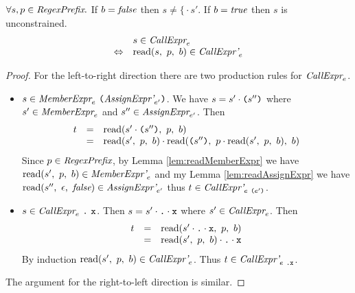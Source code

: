 \documentclass[preprint,10pt]{sigplanconf}
\begin{document}
\begin{lemma}\mbox{}
  
  \( \forall s, p \in \textit{RegexPrefix}. \)
  If \( b = \textit{false} \) then \( s \not = \texttt{\{} \cdot s' \). If \(
  b = \textit{true} \) then \( s \) is unconstrained.
  \[ 
  \begin{array}{rl}
  &s \in \textit{CallExpr}_{e} 
  \\
  \Leftrightarrow &
  \textrm{read}(s,~p,~b) \in \textit{CallExpr'}_{e} 
  \end{array}
  \]
\end{lemma}
\begin{proof}
  For the left-to-right direction there are two production rules for
  \( \textit{CallExpr}_{e} \).
  \begin{itemize}
  \item \( s \in
    \textit{MemberExpr}_{e}~ \texttt{(}\textit{AssignExpr'}_{e'}\texttt{)} \). We
    have \( s = s' \cdot \texttt{(}s''\texttt{)} \) where \( s' \in
    \textit{MemberExpr}_{e} \) and \( s'' \in \textit{AssignExpr}_{e'} \).
    Then
    \[
    \begin{array}{rcl}
      t &=& \textrm{read}(s' \cdot \texttt{(}s''\texttt{)},~p,~b)
      \\
      &=& \textrm{read}(s',~p,~b) \cdot
      \textrm{read}(\texttt{(}s''\texttt{)},~
        p \cdot \textrm{read}(s',~p,~b)
      ,~b)
    \end{array}
    \]
    Since \( p \in \textit{RegexPrefix} \), by Lemma
    \ref{lem:readMemberExpr} we have \( \textrm{read}(s',~p,~b) \in
    \textit{MemberExpr'}_{e} \) and my Lemma
    \ref{lem:readAssignExpr} we have
    \(\textrm{read}(s'',~\epsilon,~\textit{false}) \in
    \textit{AssignExpr'}_{e'} \) thus \( t \in
    \textit{CallExpr'}_{e~\texttt{(}e'\texttt{)}} \).

  \item \( s \in \textit{CallExpr}_{e} ~\texttt{.} ~\texttt{x} \). Then \( s =
    s' \cdot \texttt{.}\cdot \texttt{x} \) where \( s' \in
    \textit{CallExpr}_{e} \). Then
    \[
    \begin{array}{rcl}
      t &=& \textrm{read}(s' \cdot \texttt{.} \cdot \texttt{x},~p,~b)
      \\
      &=& \textrm{read}(s',~p,~b) \cdot \texttt{.}\cdot \texttt{x}
    \end{array}
    \]
    By induction \( \textrm{read}(s',~p,~b) \in \textit{CallExpr'}_{e}
    \). Thus \( t \in \textit{CallExpr'}_{e~\texttt{.\texttt{x}}} \).
  \end{itemize}
  
  The argument for the right-to-left direction is similar.
\end{proof}
\end{document}
